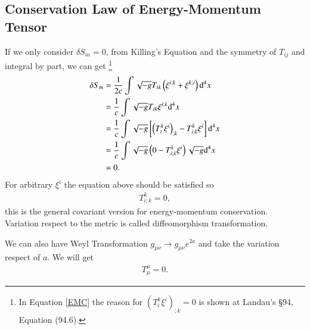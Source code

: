 \documentclass[openany,10pt]{book}
\theoremstyle{definition}
\theoremstyle{definition}
\theoremstyle{remark}
\newcommand{\be}{\begin{eqnarray}}
\newcommand{\ee}{\end{eqnarray}}
\begin{document}
\subsection{Conservation Law of Energy-Momentum Tensor}
If we only consider $\delta S_m=0$, from Killing's Equation and the symmetry of $T_{ij}$ and integral by part, we can get \footnote{In Equation \ref{EMC} the reason for $\left(T^k_i\xi^i\right)_{;k}=0$ is shown at Landau's \S 94, Equation (94.6).}
\be\label{EMC}
\begin{aligned}
\delta S_m&=\frac{1}{2c}\int\sqrt{-g}T_{ik}\left(\xi^{i;k}+\xi^{k;i}\right){\rm d}^4x\\
&=\frac{1}{c}\int\sqrt{-g}T_{ik}\xi^{i;k}{\rm d}^4x\\
&=\frac{1}{c}\int\sqrt{-g}\left[\left(T^k_i\xi^i\right)_{;k}-T^k_{i;k}\xi^i\right]{\rm {d}}^4x\\
&=\frac{1}{c}\int\sqrt{-g} \left(0-T^k_{i;k}\xi^i\right)\sqrt{-g}{\rm {d}}^4x\\
&=0.
\end{aligned}
\ee
For arbitrary $\xi^i$ the equation above should be satisfied so
\be
T^k_{i;k}=0,
\ee
this is the general covariant version for energy-momentum conservation.\\
Variation respect to the metric is called diffeomorphism transformation.

We can also have Weyl Transformation
$g_{\mu\nu}\longrightarrow g_{\mu\nu}e^{2a}$ and take the variation respect of $a$. We will get
\be
T^\mu_{\mu}=0.
\ee
\end{document}
